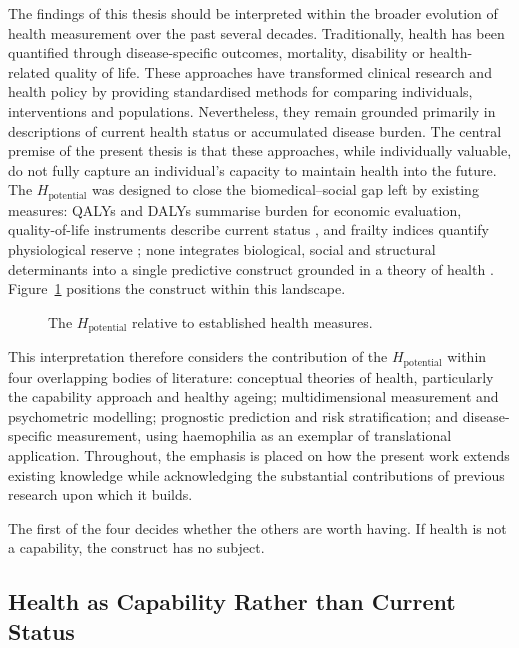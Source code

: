 \noindent The findings of this thesis should be interpreted within the broader evolution of health measurement over the past several decades. Traditionally, health has been quantified through disease-specific outcomes, mortality, disability or health-related quality of life. These approaches have transformed clinical research and health policy by providing standardised methods for comparing individuals, interventions and populations. Nevertheless, they remain grounded primarily in descriptions of current health status or accumulated disease burden. The central premise of the present thesis is that these approaches, while individually valuable, do not fully capture an individual's capacity to maintain health into the future. The $H_{\text{potential}}$ was designed to close the biomedical--social gap left by existing measures: QALYs and DALYs summarise burden for economic evaluation, quality-of-life instruments describe current status \citep{whitehead_2010}, and frailty indices quantify physiological reserve \citep{searle_2008}; none integrates biological, social and structural determinants into a single predictive construct grounded in a theory of health \citep{sen_1993,who_2015_ageing,marmot_2005}. Figure~\ref{fig:landscape} positions the construct within this landscape.

\begin{figure}[htbp]
\centering

\captionsetup{justification=justified, width=\linewidth}
\caption{The $H_{\text{potential}}$ relative to established health measures.}
\label{fig:landscape}
\end{figure}

This interpretation therefore considers the contribution of the $H_{\text{potential}}$ within four overlapping bodies of literature: conceptual theories of health, particularly the capability approach and healthy ageing; multidimensional measurement and psychometric modelling; prognostic prediction and risk stratification; and disease-specific measurement, using haemophilia as an exemplar of translational application. Throughout, the emphasis is placed on how the present work extends existing knowledge while acknowledging the substantial contributions of previous research upon which it builds.

The first of the four decides whether the others are worth having. If health is
not a capability, the construct has no subject.

\subsection{Health as Capability Rather than Current Status}
\label{sec:disc-capability}


